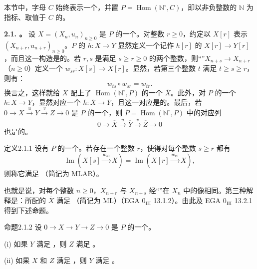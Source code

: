本节中，字母 $C$ 始终表示一个，并置 $P=\operatorname{Hom}(\mathbb N^\circ,C)$，即以非负整数的 $\mathbb N$ 为指标、取值于 $C$ 的。

\textbf{2.1. 。} 设 $X=(X_n,u_n)_{n\geq0}$ 是 $P$ 的一个。对整数 $r\geq0$，约定以 $X[r]$ 表示 $(X_{n+r},u_{n+r})_{n\geq0}$。$P$ 的 $h:X\to Y$ 显然定义一个记作 $h[r]$ 的 $X[r]\to Y[r]$，而且这一构造是的。若 $r,s$ 是满足 $s\geq r\geq0$ 的两个整数，则“”$X_{n+s}\to X_{n+r}$（$n\geq0$）定义一个 $w_{sr}:X[s]\to X[r]$。显然，若第三个整数 $t$ 满足 $t\geq s\geq r$，则有：
\[
w_{ts}\circ w_{sr}=w_{tr}.
\]
换言之，这样就给 $X$ 配上了 $\operatorname{Hom}(\mathbb N^\circ,P)$ 的一个 $\overline X$。此外，对 $P$ 的一个 $h:X\to Y$，显然对应一个 $\overline h:\overline X\to\overline Y$，且这一对应是的。最后，若 $0\to X\xrightarrow{u}Y\xrightarrow{v}Z\to0$ 是 $P$ 的一个，则 $\overline P=\operatorname{Hom}(\mathbb N^\circ,P)$ 中的对应列
\[
0\longrightarrow\overline X\xrightarrow{\overline u}\overline Y\xrightarrow{\overline v}\overline Z\longrightarrow0
\]
也是的。
\begin{SGAresult}{定义}{2.1.1}
设有 $P$ 的一个。若存在一个整数 $r$，使得对每个整数 $s\geq r$ 都有
\[
\operatorname{Im}(X[s]\xrightarrow{w_{s0}}X)=\operatorname{Im}(X[r]\xrightarrow{w_{r0}}X),
\]
则称它满足 （简记为 MLAR）。
\end{SGAresult}
也就是说，对每个整数 $n\geq0$，$X_{n+r}$ 与 $X_{n+s}$ 经“”在 $X_n$ 中的像相同。第三种解释是：所配的 $\overline X$ 满足 （简记为 ML）（EGA $0_{\mathrm{III}}$ 13.1.2）。由此及 EGA $0_{\mathrm{III}}$ 13.2.1 得到下述命题。
\begin{SGAresult}{命题}{2.1.2}
设 $0\to X\to Y\to Z\to0$ 是 $P$ 的一个。

(i) 如果 $Y$ 满足 ，则 $Z$ 满足 。

(ii) 如果 $X$ 和 $Z$ 满足 ，则 $Y$ 满足 。
\end{SGAresult}
